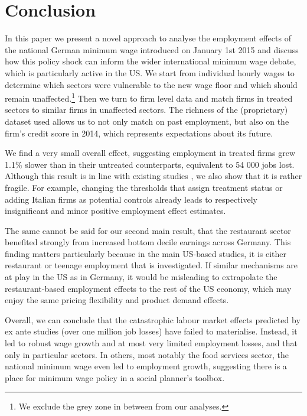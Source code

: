 \section{Conclusion} \label{chap:conclusion}
In this paper we present a novel approach to analyse the employment effects of the national German minimum wage introduced on January 1st 2015 and discuss how this policy shock can inform the wider international minimum wage debate, which is particularly active in the US. We start from individual hourly wages to determine which sectors were vulnerable to the new wage floor and which should remain unaffected.\footnote{We exclude the grey zone in between from our analyses.} Then we turn to firm level data and match firms in treated sectors to similar firms in unaffected sectors. The richness of the (proprietary) dataset used allows us to not only match on past employment, but also on the firm's credit score in 2014, which represents expectations about its future.

We find a very small overall effect, suggesting employment in treated firms grew 1.1\% slower than in their untreated counterparts, equivalent to 54 000 jobs lost. Although this result is in line with existing studies \citep{Bossler2016, Caliendo2018le}, we also show that it is rather fragile. For example, changing the thresholds that assign treatment status or adding Italian firms as potential controls already leads to respectively insignificant and minor positive employment effect estimates.

The same cannot be said for our second main result, that the restaurant sector benefited strongly from increased bottom decile earnings across Germany. This finding matters particularly because in the main US-based studies, it is either restaurant or teenage employment that is investigated. If similar mechanisms are at play in the US as in Germany, it would be misleading to extrapolate the restaurant-based employment effects to the rest of the US economy, which may enjoy the same pricing flexibility and product demand effects.

Overall, we can conclude that the catastrophic labour market effects predicted by ex ante studies (over one million job losses) have failed to materialise. Instead, it led to robust wage growth \citep{Bossler2016} and at most very limited employment losses, and that only in particular sectors. In others, most notably the food services sector, the national minimum wage even led to employment growth, suggesting there is a place for minimum wage policy in a social planner's toolbox.